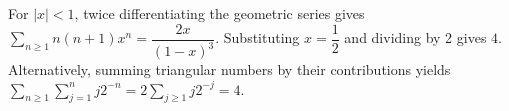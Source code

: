 For $|x|<1 $, twice differentiating the geometric series gives $\sum_{n\ge1}n(n+1)x^n=\dfrac{2x}{(1-x)^3}$. Substituting $ x=\dfrac{1}{2}$ and dividing by 2 gives $\boxed4 $. Alternatively, summing triangular numbers by their contributions yields $\sum_{n\ge1}\sum_{j=1}^n j2^{-n}=2\sum_{j\ge1}j2^{-j}=4 $.
